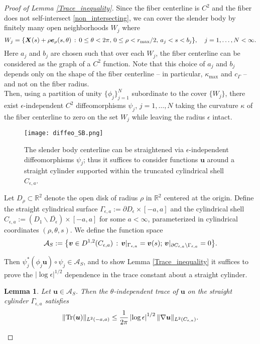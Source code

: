 \documentclass[11pt]{article}
\numberwithin{equation}{section}
\newcommand{\R}{\mathbb{R}}
\newcommand{\A}{\mathcal{A}}
\newcommand{\bu}{\bm{u}}
\newcommand{\X}{\bm{X}}
\newcommand{\be}{\bm{e}}
\newcommand{\bv}{\bm{v}}
\newcommand{\p}{\partial}
\newcommand{\ts}{\thinspace}
\newcommand{\abs}[1]{\left\lvert #1 \right\rvert}
\newtheorem{lemma}[theorem]{Lemma}
\theoremstyle{definition}
\begin{document}
\begin{proof}[Proof of Lemma \ref{Trace_inequality}]
Since the fiber centerline is $C^2$ and the fiber does not self-intersect \eqref{non_intersecting}, we can cover the slender body by finitely many open neighborhoods $W_j$ where 
\[ W_j = \{ \X(s)+\rho\be_\rho(s,\theta) \ts : \ts 0\le \theta < 2\pi, \ts 0 \le \rho < r_{\max}/2, \ts a_j < s < b_j\}, \quad j=1,\dots,N <\infty.\]
Here $a_j$ and $b_j$ are chosen such that over each $W_j$, the fiber centerline can be considered as the graph of a $C^2$ function. Note that this choice of $a_j$ and $b_j$ depends only on the shape of the fiber centerline -- in particular, $\kappa_{\max}$ and $c_{\Gamma}$ -- and not on the fiber radius. \\

Then, using a partition of unity $\{\phi_j\}_{j=1}^N$ subordinate to the cover $\{W_j\}$, there exist $\epsilon$-independent $C^2$ diffeomorphisms $\psi_j$, $j=1,\dots,N$ taking the curvature $\kappa$ of the fiber centerline to zero on the set $W_j$ while leaving the radius $\epsilon$ intact. \\ 

\begin{figure}[!h]
\centering
\texttt{[image: diffeo\_SB.png]}\\
\caption{ The slender body centerline can be straightened via $\epsilon$-independent diffeomorphisms $\psi_j$; thus it suffices to consider functions $\bu$ around a straight cylinder supported within the truncated cylindrical shell $C_{\epsilon,a}$.}
\label{fig:diffeo_SB}
\end{figure}

Let $D_{\rho}\subset \R^2$ denote the open disk of radius $\rho$ in $\R^2$ centered at the origin. Define the straight cylindrical surface $\Gamma_{\epsilon,a}:= \p D_{\epsilon}\times [-a,a]$ and the cylindrical shell $C_{\epsilon,a}:= (D_1\backslash \overline{D_{\epsilon}})\times [-a,a]$ for some $a<\infty$, parameterized in cylindrical coordinates $(\rho,\theta,s)$. We define the function space 
\[\A_S:= \big\{ \bv\in D^{1,2}(C_{\epsilon,a}) \ts : \ts \bv|_{\Gamma_{\epsilon,a}} = \bv(s); \ts \bv|_{\p C_{\epsilon,a}\backslash\Gamma_{\epsilon,a}} = 0 \big\}. \]

Then $\psi_j^*(\phi_j\bu)\circ \psi_j\in \A_S$, and to show Lemma \ref{Trace_inequality} it suffices to prove the $\abs{\log\epsilon}^{1/2}$ dependence in the trace constant about a straight cylinder.
\begin{lemma}\label{trace_straight_cylinder}
Let $\bu\in \A_S$. Then the $\theta$-independent trace of $\bu$ on the straight cylinder $\Gamma_{\epsilon,a}$ satisfies
\begin{equation}\label{cylinder_trace}
\|{\rm Tr}(\bu)\|_{L^2(-a,a)} \le \frac{1}{2\pi}\abs{\log\epsilon}^{1/2}\|\nabla \bu\|_{L^2(C_{\epsilon,a})}.
\end{equation}
\end{lemma}


\end{proof}
\end{document}
